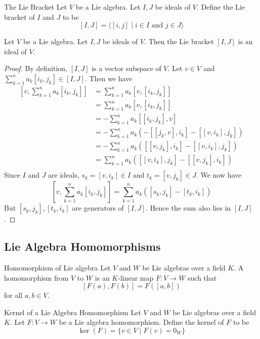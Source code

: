 \documentclass[a4paper]{article}
\begin{document}
\begin{defn}{The Lie Bracket}{} Let $V$ be a Lie algebra. Let $I,J$ be ideals of $V$. Define the Lie bracket of $I$ and $J$ to be $$[I,J]=\langle[i,j]\;|\;i\in I\text{ and }j\in J\rangle$$
\end{defn}

\begin{lmm}{}{} Let $V$ be a Lie algebra. Let $I,J$ be ideals of $V$. Then the Lie bracket $[I,J]$ is an ideal of $V$. \tcbline
\begin{proof}
By definition, $[I,J]$ is a vector subspace of $V$. Let $v\in V$ and $\sum_{k=1}^na_k[i_k,j_k]\in[I,J]$. Then we have
\begin{align*}
\left[v,\sum_{k=1}^na_k[i_k,j_k]\right]&=\sum_{k=1}^na_k[v,[i_k,j_k]]\\
&=\sum_{k=1}^na_k[v,[i_k,j_k]]\\
&=-\sum_{k=1}^na_k[[i_k,j_k],v]\\
&=-\sum_{k=1}^na_k\left(-[[j_k,v],i_k]-[[v,i_k],j_k]\right)\\
&=-\sum_{k=1}^na_k\left([[v,j_k],i_k]-[[v,i_k],j_k]\right)\\
&=\sum_{k=1}^na_k\left([[v,i_k],j_k]-[[v,j_k],i_k]\right)\\
\end{align*}
Since $I$ and $J$ are ideals, $s_k=[v,i_k]\in I$ and $t_k=[v,j_k]\in J$. We now have $$\left[v,\sum_{k=1}^na_k[i_k,j_k]\right]=\sum_{k=1}^na_k\left([s_k,j_k]-[t_k,i_k]\right)$$ But $[s_k,j_k],[t_k,i_k]$ are generators of $[I,J]$. Hence the sum also lies in $[I,J]$. 
\end{proof}
\end{lmm}

\subsection{Lie Algebra Homomorphisms}
\begin{defn}{Homomorphism of Lie algebra}{} Let $V$ and $W$ be Lie algebras over a field $K$. A homomorphism from $V$ to $W$ is an $K$-linear map $F:V\to W$ such that $$[F(a),F(b)]=F\left([a,b]\right)$$ for all $a,b\in V$. 
\end{defn}

\begin{defn}{Kernel of a Lie Algebra Homomorphism}{} Let $V$ and $W$ be Lie algebras over a field $K$. Let $F:V\to W$ be a Lie algebra homomorphism. Define the kernel of $F$ to be $$\ker(F)=\{v\in V\;|\;F(v)=0_W\}$$
\end{defn}
\end{document}
